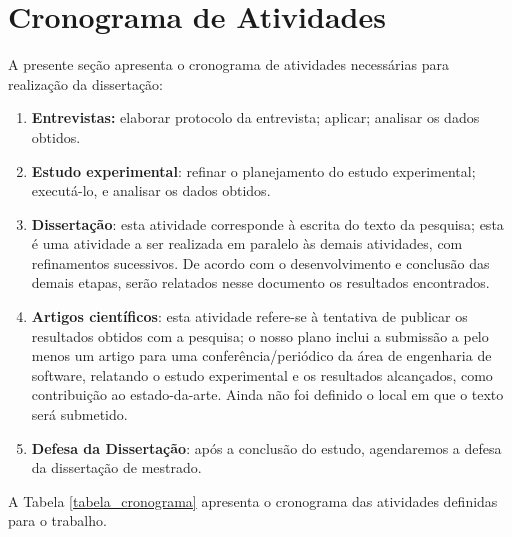 \section{Cronograma de Atividades}

A presente seção apresenta o cronograma de atividades necessárias para realização da dissertação:

\begin{enumerate}[label=\bf AT\arabic*,leftmargin=1.7cm]

    \item \textbf{Entrevistas:} elaborar protocolo da entrevista; aplicar; analisar os dados obtidos.
    
    \item \textbf{Estudo experimental}: refinar o planejamento do estudo experimental; executá-lo, e analisar os dados obtidos.
    
    \item \textbf{Dissertação}: esta atividade corresponde à escrita do texto da pesquisa; esta é uma atividade a ser realizada em paralelo às demais atividades, com refinamentos sucessivos. De acordo com o desenvolvimento e conclusão das demais etapas, serão relatados nesse documento os resultados encontrados.
    
    \item \textbf{Artigos científicos}: esta atividade refere-se à tentativa de publicar os resultados obtidos com a pesquisa; o nosso plano inclui a submissão a pelo menos um artigo para uma conferência/periódico da área de engenharia de software, relatando o estudo experimental e os resultados alcançados, como contribuição ao estado-da-arte. Ainda não foi definido o local em que o texto será submetido.
    
    \item \textbf{Defesa da Dissertação}: após a conclusão do estudo, agendaremos a defesa da dissertação de mestrado. 

\end{enumerate}

A Tabela \ref{tabela_cronograma} apresenta o cronograma das atividades definidas para o trabalho.

